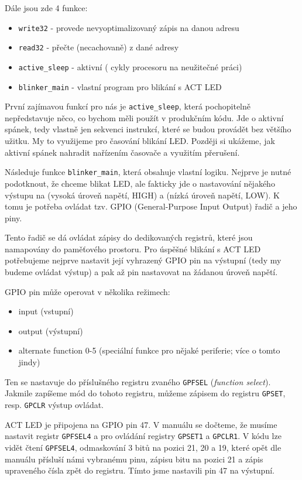 \documentclass{article}
\begin{document}
Dále jsou zde 4 funkce:
\begin{itemize}
	\item \texttt{write32} - provede nevyoptimalizovaný zápis na danou adresu
	\item \texttt{read32} - přečte (necachovaně) z dané adresy
	\item \texttt{active\_sleep} - aktivní  ( cykly procesoru na neužitečné práci)
	\item \texttt{blinker\_main} - vlastní program pro blikání s ACT LED
\end{itemize}

První zajímavou funkcí pro nás je \texttt{active\_sleep}, která pochopitelně nepředstavuje něco, co bychom měli použít v produkčním kódu. Jde o aktivní spánek, tedy vlastně jen sekvenci instrukcí, které se budou provádět bez většího užitku. My to využijeme pro časování blikání LED. Později si ukážeme, jak aktivní spánek nahradit nařízením časovače a využitím přerušení.

Následuje funkce \texttt{blinker\_main}, která obsahuje vlastní logiku. Nejprve je nutné podotknout, že chceme blikat LED, ale fakticky jde o nastavování nějakého výstupu na  (vysoká úroveň napětí, HIGH) a  (nízká úroveň napětí, LOW). K tomu je potřeba ovládat tzv. GPIO (General-Purpose Input Output) řadič a jeho piny.

Tento řadič se dá ovládat zápisy do dedikovaných registrů, které jsou namapovány do paměťového prostoru. Pro úspěšné blikání s ACT LED potřebujeme nejprve nastavit její vyhrazený GPIO pin na výstupní (tedy my budeme ovládat výstup) a pak až pin nastavovat na žádanou úroveň napětí.

GPIO pin může operovat v několika režimech:
\begin{itemize}
	\item input (vstupní)
	\item output (výstupní)
	\item alternate function 0-5 (speciální funkce pro nějaké periferie; více o tomto jindy)
\end{itemize}

Ten se nastavuje do příslušného registru zvaného \texttt{GPFSEL} (\emph{function select}). Jakmile zapíšeme mód do tohoto registru, můžeme zápisem do registru \texttt{GPSET}, resp. \texttt{GPCLR} výstup ovládat.

ACT LED je připojena na GPIO pin 47. V manuálu se dočteme, že musíme nastavit registr \texttt{GPFSEL4} a pro ovládání registry \texttt{GPSET1} a \texttt{GPCLR1}. V kódu lze vidět čtení \texttt{GPFSEL4}, odmaskování 3 bitů na pozici 21, 20 a 19, které opět dle manuálu přísluší námi vybranému pinu, zápisu bitu na pozici 21 a zápis upraveného čísla zpět do registru. Tímto jsme nastavili pin 47 na výstupní.
\end{document}
